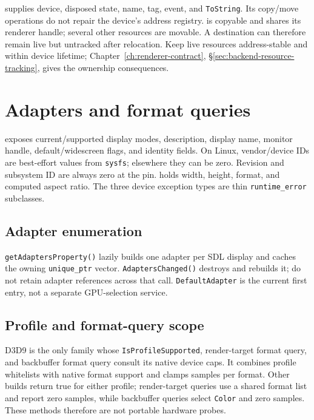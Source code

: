  supplies device, disposed state, name, tag, event, and
\texttt{ToString}. Its copy/move operations do not repair the device's address registry.
 is copyable and shares its renderer handle; several other resources are
movable. A destination can therefore remain live but untracked after relocation. Keep live
resources address-stable and within device lifetime; Chapter~\ref{ch:renderer-contract},
\S\ref{sec:backend-resource-tracking}, gives the ownership consequences.

\section{Adapters and format queries}
\label{sec:adapter-displaymode}

 exposes current/supported display modes, description, display name,
monitor handle, default/widescreen flags, and identity fields. On Linux, vendor/device IDs are
best-effort values from \texttt{sysfs}; elsewhere they can be zero. Revision and subsystem ID
are always zero at the pin.  holds width, height, format, and computed
aspect ratio. The three device exception types are thin \texttt{runtime\_error} subclasses.

\subsection{Adapter enumeration}
\label{sec:adapters-list}

\texttt{getAdaptersProperty()} lazily builds one adapter per SDL display and caches the owning
\texttt{unique\_ptr} vector. \texttt{AdaptersChanged()} destroys and rebuilds it; do not retain
adapter references across that call. \texttt{DefaultAdapter} is the current first entry, not a
separate GPU-selection service.

\subsection{Profile and format-query scope}
\label{sec:adapter-format-queries}

D3D9 is the only family whose \texttt{IsProfileSupported}, render-target format query, and
backbuffer format query consult its native device caps. It combines profile whitelists with
native format support and clamps samples per format. Other builds return true for either profile;
render-target queries use a shared format list and report zero samples, while backbuffer queries
select \texttt{Color} and zero samples. These methods therefore are not portable hardware probes.

